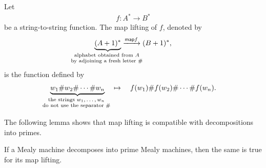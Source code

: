 \begin{definition}\label{def:map-lifting}
    Let 
    \begin{align*}
    f : A^* \to B^*
    \end{align*}
    be a string-to-string function. The map lifting of $f$, denoted by 
    \begin{align*}
    \myunderbrace{(A+1)^*}{alphabet obtained from $A$ \\ by adjoining a fresh letter $\#$} \xrightarrow{\map f} (B+1)^*,
\end{align*}
     is the function defined by 
         \begin{align*}
    \myunderbrace{w_1 \# w_2 \# \cdots \# w_n}{the strings $w_1,\ldots,w_n$ \\ do not  use the separator $\#$} 
    \quad \mapsto \quad 
    f(w_1) \# f(w_2) \# \cdots \# f(w_n).
    \end{align*}
\end{definition}

  The following lemma shows that map lifting is compatible with decompositions into primes. 

\begin{lemma}\label{lem:map-lifting-decomposition-mealy}
    If a Mealy machine decomposes into prime Mealy machines, then the same is true for its map lifting.
\end{lemma}

